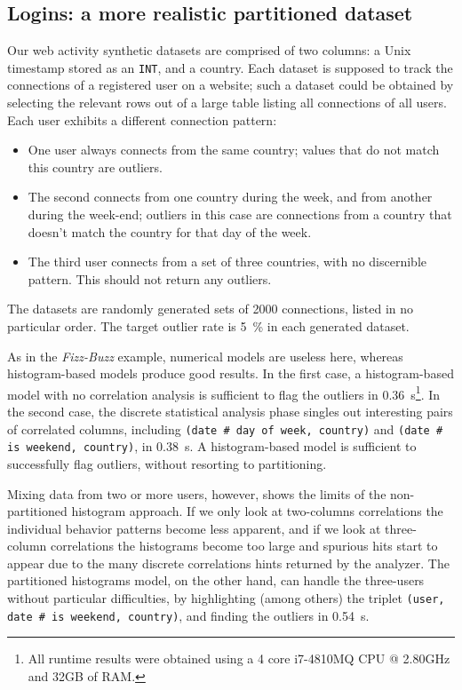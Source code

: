 \subsection{Logins: a more realistic partitioned dataset}

Our web activity synthetic datasets are comprised of two columns: a Unix timestamp stored as an \texttt{INT}, and a country. Each dataset is supposed to track the connections of a registered user on a website; such a dataset could be obtained by selecting the relevant rows out of a large table listing all connections of all users. Each user exhibits a different connection pattern:

\begin{itemize}
\item One user always connects from the same country; values that do not match this country are outliers.
\item The second connects from one country during the week, and from another during the week-end; outliers in this case are connections from a country that doesn't match the country for that day of the week.
\item The third user connects from a set of three countries, with no discernible pattern. This should not return any outliers.
\end{itemize}

The datasets are randomly generated sets of 2000 connections, listed in no particular order. The target outlier rate is \SI{5}{\percent} in each generated dataset.

\newcommand{\prop}[2]{#1\,\#\,#2}

As in the \emph{Fizz-Buzz} example, numerical models are useless here, whereas histogram-based models produce good results. In the first case, a histogram-based model with no correlation analysis is sufficient to flag the outliers in \SI{0.36}{\second}\footnote{All runtime results were obtained using a 4 core i7-4810MQ CPU @ 2.80GHz and 32GB of RAM.}. In the second case, the discrete statistical analysis phase singles out interesting pairs of correlated columns, including \texttt{(\prop{date}{day of week}, country)} and \texttt{(\prop{date}{is weekend}, country)}, in \SI{0.38}{\second}. A histogram-based model is sufficient to successfully flag outliers, without resorting to partitioning.


Mixing data from two or more users, however, shows the limits of the non-partitioned histogram approach. If we only look at two-columns correlations the individual behavior patterns become less apparent, and if we look at three-column correlations the histograms become too large and spurious hits start to appear due to the many discrete correlations hints returned by the analyzer. The partitioned histograms model, on the other hand, can handle the three-users without particular difficulties, by highlighting (among others) the triplet \texttt{(user, \prop{date}{is weekend}, country)}, and finding the outliers in \SI{0.54}{\second}.